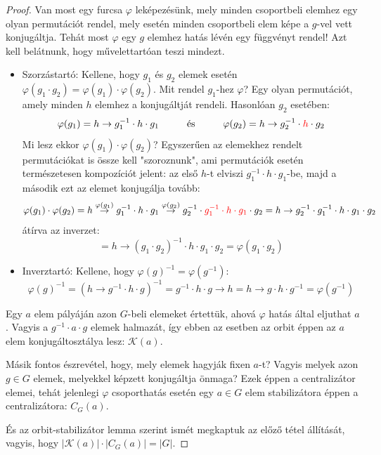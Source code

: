 \documentclass[12pt]{book}
\theoremstyle{plain} %
\theoremstyle{definition} %
\theoremstyle{remark}
\numberwithin{equation}{section}  %
\begin{document}
	\begin{proof}
		Van most egy furcsa $\varphi$ leképezésünk, mely minden csoportbeli elemhez egy olyan permutációt rendel, mely esetén minden csoportbeli elem képe a $g$-vel vett konjugáltja. Tehát most $\varphi$ egy $g$ elemhez hatás lévén egy függvényt rendel! Azt kell belátnunk, hogy művelettartóan teszi mindezt.
		
		\begin{itemize}
			\item Szorzástartó: Kellene, hogy $g_1$ és $g_2$ elemek esetén $\varphi(g_1\cdot g_2) = \varphi(g_1) \cdot \varphi(g_2)$. Mit rendel $g_1$-hez $\varphi$? Egy olyan permutációt, amely minden $h$ elemhez a konjugáltját rendeli. Hasonlóan $g_2$ esetében:
			\[ \varphi(g_1) = h \to g_1^{-1}\cdot h \cdot g_1 \hspace{10mm} \text{és} \hspace{10mm} \varphi(g_2) = h \to g_2^{-1} \cdot \color{red} h \color{black} \cdot g_2  \]
			Mi lesz ekkor $\varphi(g_1)\cdot \varphi(g_2)$? Egyszerűen az elemekhez rendelt permutációkat is össze kell "szoroznunk", ami permutációk esetén természetesen kompozíciót jelent: az első $h$-t elviszi $g_1^{-1}\cdot h\cdot g_1$-be, majd a második ezt az elemet konjugálja tovább:
			\[ \varphi(g_1)\cdot \varphi(g_2) = h\stackrel{\varphi(g_1)}{\to} g_1^{-1} \cdot h \cdot g_1 \stackrel{\varphi(g_2)}{\to} g_2^{-1} \cdot \color{red} g_1^{-1} \cdot h \cdot g_1 \color{black} \cdot g_2 = h \to g_2^{-1} \cdot g_1^{-1} \cdot h \cdot g_1 \cdot g_2 \]
			átírva az inverzet:
			\[ = h \to (g_1\cdot g_2)^{-1} \cdot h \cdot g_1 \cdot g_2 = \varphi(g_1\cdot g_2)  \]
			\item Inverztartó: Kellene, hogy $\varphi(g)^{-1} = \varphi\left(g^{-1}\right)$:
			\[ \varphi(g)^{-1} = \left(h\to g^{-1} \cdot h \cdot g\right)^{-1} = g^{-1} \cdot h \cdot g \to h = h \to g\cdot h \cdot g^{-1}  = \varphi\left(g^{-1}\right) \]
		\end{itemize}
		Egy $a$ elem pályáján azon $G$-beli elemeket értettük, ahová $\varphi$ hatás által eljuthat $a$. Vagyis a $g^{-1} \cdot a \cdot g$ elemek halmazát, így ebben az esetben az orbit éppen az $a$ elem konjugáltosztálya lesz: $\mathcal{K}(a)$.
		
		Másik fontos észrevétel, hogy, mely elemek hagyják fixen $a$-t? Vagyis melyek azon $g\in G$ elemek, melyekkel képzett konjugáltja önmaga? Ezek éppen a centralizátor elemei, tehát jelenlegi $\varphi$ csoporthatás esetén egy $a\in G$ elem stabilizátora éppen a centralizátora: $C_G(a)$.
		
		És az orbit-stabilizátor lemma szerint ismét megkaptuk az előző tétel állítását, vagyis, hogy $|\mathcal{K}(a)| \cdot |C_G(a)| = |G|$.
	\end{proof}
	
\end{document}
